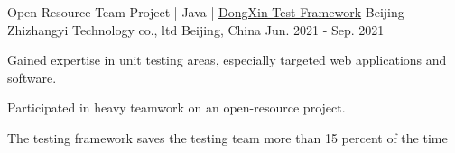 \begin{cventries}
  \cventry
    {Open Resource Team Project | Java | \href{https://github.com/jerryyangboyu/dongxin-test-framework}{\faGithubSquare\acvHeaderIconSep DongXin Test Framework}}
    {Beijing Zhizhangyi Technology co., ltd}
    {Beijing, China}
    {Jun. 2021 - Sep. 2021}
    {
      \begin{cvitems}
        \item {Gained expertise in unit testing areas, especially targeted web applications and software.}
        \item {Participated in heavy teamwork on an open-resource project.}
        \item {The testing framework saves the testing team more than 15 percent of the time}
      \end{cvitems}
    }
\end{cventries}
